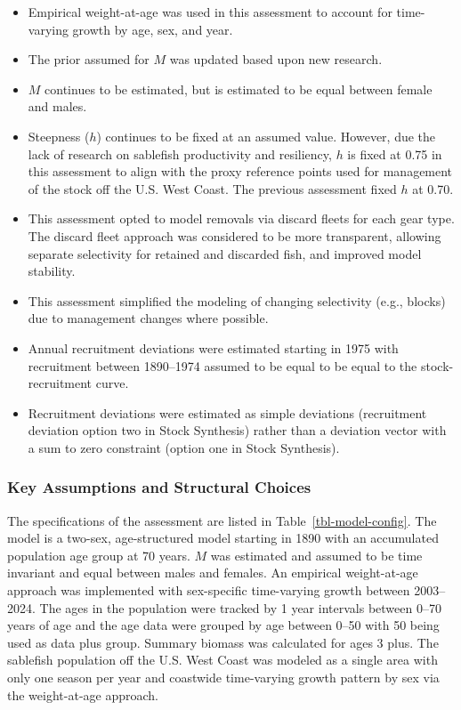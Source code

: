 \documentclass[
  english,
]{article}
\begin{document}
\begin{itemize}
  vector was estimated using a spatial modeling approach that supported
  the development of a biomass-weighted maturity curve to better account
  for variation in maturity-at-age by area north and south of
  36\(^\circ\) N. latitude.
\item
  Empirical weight-at-age was used in this assessment to account for
  time-varying growth by age, sex, and year.
\item
  The prior assumed for \(M\) was updated based upon new research.
\item
  \(M\) continues to be estimated, but is estimated to be equal between
  female and males.
\item
  Steepness (\(h\)) continues to be fixed at an assumed value. However,
  due the lack of research on sablefish productivity and resiliency,
  \(h\) is fixed at 0.75 in this assessment to align with the proxy
  reference points used for management of the stock off the U.S. West
  Coast. The previous assessment fixed \(h\) at 0.70.
\item
  This assessment opted to model removals via discard fleets for each
  gear type. The discard fleet approach was considered to be more
  transparent, allowing separate selectivity for retained and discarded
  fish, and improved model stability.
\item
  This assessment simplified the modeling of changing selectivity (e.g.,
  blocks) due to management changes where possible.
\item
  Annual recruitment deviations were estimated starting in 1975 with
  recruitment between 1890--1974 assumed to be equal to be equal to the
  stock-recruitment curve.
\item
  Recruitment deviations were estimated as simple deviations
  (recruitment deviation option two in Stock Synthesis) rather than a
  deviation vector with a sum to zero constraint (option one in Stock
  Synthesis).
\end{itemize}

\subsubsection{Key Assumptions and Structural
Choices}\label{key-assumptions-and-structural-choices}

The specifications of the assessment are listed in
Table~\ref{tbl-model-config}. The model is a two-sex, age-structured
model starting in 1890 with an accumulated population age group at 70
years. \(M\) was estimated and assumed to be time invariant and equal
between males and females. An empirical weight-at-age approach was
implemented with sex-specific time-varying growth between 2003--2024.
The ages in the population were tracked by 1 year intervals between
0--70 years of age and the age data were grouped by age between 0--50
with 50 being used as data plus group. Summary biomass was calculated
for ages 3 plus. The sablefish population off the U.S. West Coast was
modeled as a single area with only one season per year and coastwide
time-varying growth pattern by sex via the weight-at-age approach.
\end{document}
